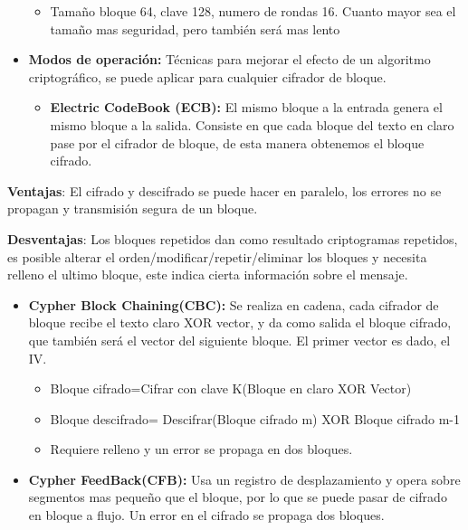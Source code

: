 \documentclass[12pt, twoside, openright]{report} %
\begin{document}
\begin{itemize}
\begin{itemize}
    \item Tamaño bloque 64, clave 128, numero de rondas 16. Cuanto mayor sea
      el tamaño mas seguridad, pero también será mas lento
      
    \end{itemize}
  \item \textbf{Modos de operación:} Técnicas para mejorar el efecto de un
    algoritmo criptográfico, se puede aplicar para cualquier cifrador de
    bloque.
    

    \begin{itemize}
    \item \textbf{Electric CodeBook (ECB):} El mismo bloque a la entrada
      genera el mismo bloque a la salida. Consiste en que cada bloque
      del texto en claro pase por el cifrador de bloque, de esta manera
      obtenemos el bloque cifrado.
      
    \end{itemize}
  \end{itemize}

  


  \textbf{Ventajas}: El cifrado y descifrado se puede hacer en paralelo,
  los errores no se propagan y transmisión segura de un bloque.

  \textbf{Desventajas}: Los bloques repetidos dan como resultado
  criptogramas repetidos, es posible alterar el
  orden/modificar/repetir/eliminar los bloques y necesita relleno el
  ultimo bloque, este indica cierta información sobre el mensaje.

  \begin{itemize}
  \item \textbf{Cypher Block Chaining(CBC):} Se realiza en cadena, cada
    cifrador de bloque recibe el texto claro XOR vector, y da como
    salida el bloque cifrado, que también será el vector del siguiente
    bloque. El primer vector es dado, el IV.
    

    \begin{itemize}
    \item Bloque cifrado=Cifrar con clave K(Bloque en claro XOR Vector)
      
    \item Bloque descifrado= Descifrar(Bloque cifrado m) XOR Bloque cifrado
      m-1
      
    \item Requiere relleno y un error se propaga en dos bloques.
      
    \end{itemize}
  \item \textbf{Cypher FeedBack(CFB):} Usa un registro de desplazamiento y
    opera sobre segmentos mas pequeño que el bloque, por lo que se puede
    pasar de cifrado en bloque a flujo. Un error en el cifrado se
    propaga dos bloques.
    
  \end{itemize}
\end{document}
